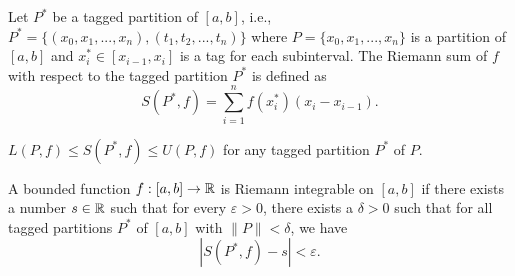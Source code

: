 \begin{definition} 
    Let $P^*$ be a tagged partition of $[a,b]$, i.e., $P^* = \{(x_0,x_1,...,x_n), (t_1,t_2,...,t_n)\}$ where $P = \{x_0,x_1,...,x_n\}$ is a partition of $[a,b]$ and $x_i^* \in [x_{i-1},x_i]$ is a tag for each subinterval. The Riemann sum of $f$ with respect to the tagged partition $P^*$ is defined as
    \[
        S(P^*,f) = \sum_{i=1}^n f(x_i^*)(x_i - x_{i-1}).
    \]
\end{definition}

\begin{remark}
    $L(P,f) \le S(P^*,f) \le U(P,f)$ for any tagged partition $P^*$ of $P$.
\end{remark}

\begin{definition}
    A bounded function $f:[a,b]\to\mathbb{R}$ is Riemann integrable on $[a,b]$ if there exists a number $s\in\mathbb{R}$ such that for every $\varepsilon > 0$, there exists a $\delta > 0$ such that for all tagged partitions $P^*$ of $[a,b]$ with $\|P\| < \delta$, we have
    \[
        |S(P^*,f) - s| < \varepsilon.
    \]
\end{definition}

